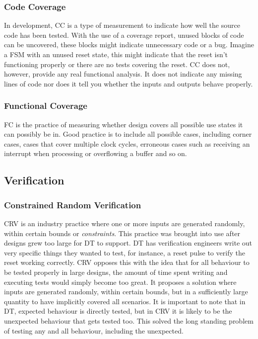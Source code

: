 \documentclass[11pt,british]{article}
\begin{document}
\subsubsection{Code Coverage}
In development, \gls{CC} is a type of measurement to indicate how well the source code has been tested. With the use of a coverage report, unused blocks of code can be uncovered, these blocks might indicate unnecessary code or a bug. Imagine a \gls{FSM} with an unused reset state, this might indicate that the reset isn't functioning properly or there are no tests covering the reset. CC does not, however, provide any real functional analysis. It does not indicate any missing lines of code nor does it tell you whether the inputs and outputs behave properly.

\subsubsection{Functional Coverage}
\gls{FC} is the practice of measuring whether design covers all possible use states it can possibly be in. Good practice is to include all possible cases, including corner cases, cases that cover multiple clock cycles, erroneous cases such as receiving an interrupt when processing or overflowing a buffer and so on. 

\subsection{Verification}

\subsubsection{Constrained Random Verification}
\gls{CRV} is an industry practice where one or more inputs are generated randomly, within certain bounds or \emph{constraints}. This practice was brought into use after designs grew too large for \gls{DT} to support. DT has verification engineers write out very specific things they wanted to test, for instance, a reset pulse to verify the reset working correctly. CRV opposes this with the idea that for all behaviour to be tested properly in large designs, the amount of time spent writing and executing tests would simply become too great. It proposes a solution where inputs are generated randomly, within certain bounds, but in a sufficiently large quantity to have implicitly covered all scenarios. It is important to note that in DT, expected behaviour is directly tested, but in CRV it is likely to be the unexpected behaviour that gets tested too. This solved the long standing problem of testing any and all behaviour, including the unexpected.
\end{document}
